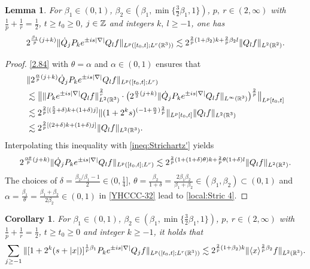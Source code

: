 \documentclass[11pt,twoside]{article}
\def\Z{\mathop{\mathbb Z\kern 0pt}\nolimits}
\def\R{\mathop{\mathbb R\kern 0pt}\nolimits}
\def\f{\frac}
\def\ls{\lesssim}
\newcommand{\w}[1]{\langle {#1} \rangle}
\newcommand{\q}{\dot{Q}}
\theoremstyle{plain}
\newtheorem{lemma}[theorem]{Lemma}
\newtheorem{cor}[theorem]{Corollary}
\theoremstyle{definition}
\numberwithin{equation}{section}
\begin{document}
	\begin{lemma}\label{lem:Localized Strichartz estimate 4}
For $\beta_1\in(0,1)$, $\beta_2\in(\beta_1,\min\{\f32\beta_1,1\})$, $p,\ r\in(2,\infty)$ with $\f1p+\f1r=\f12$,
$t\ge t_0\ge 0$,  $j\in\Z$ and integers $k,\ l\ge -1$, one has
		\begin{equation}\label{local:Stric 4}
			2^{\f{\beta_1}{p}(j+k)}\|\q_jP_{k}e^{\pm is|\nabla|}Q_lf\|_{L^p([t_0,t];L^r(\R^3))}
			\ls
			2^{\f2p(1+\beta_2)k +  \f2p\beta_2 l}\|Q_lf\|_{L^2(\R^2)}.
		\end{equation}
	\end{lemma}
	\begin{proof}
		\eqref{2.84} with $\theta={\alpha}$ and $\alpha\in(0,1)$ ensures that
		\begin{equation*}
			\begin{split}
				&\|2^{\f{\alpha}{p}(j+k)}\q_jP_{k}e^{\pm is|\nabla|}Q_lf\|_{L^p([t_0,t];L^r)}\\
				&\ls
				\big\|
				\|P_{k}e^{\pm is|\nabla|}Q_lf\|_{L^2(\R^3)}^{\f2r}
				\cdot \big(2^{\f{\alpha}{{2}}(j+k)}\|\q_jP_{k}e^{\pm is|\nabla|}Q_lf\|_{L^\infty(\R^3)}\big)^{\f2p}
				\big\|_{L^p[t_0,t]}\\
				&\ls
				2^{\f2p[(\f52+\delta)k+(1+\delta)j]}\|(1+2^ks)^{(-1+\f\alpha 2)\f2p}\|_{L^p[t_0,t]}\|Q_lf\|_{L^2(\R^3)}\\
				&\ls
				2^{\f2p[(2+\delta)k+(1+\delta)j]}\|Q_lf\|_{L^2(\R^3)}.
			\end{split}
		\end{equation*}
		Interpolating this inequality with \eqref{ineq:Strichartz'} yields
		\begin{equation}\label{YHCCC-32}
			2^{\f{\alpha\theta}{p}(j+k)}\|\q_jP_{k}e^{\pm is|\nabla|}Q_lf\|_{L^p([t_0,t];L^r)}
			\ls 2^{\f2p(1+(1+\delta)\theta)k +  \f2p\theta(1+\delta) l}\|Q_lf\|_{L^2(\R^2)}.
		\end{equation}
		The choices of $\delta=\f{\beta_2/\beta_1-1}{2}\in(0,\f14]$, $\theta = \f{\beta_2}{1+\delta} = \f{2\beta_1\beta_2}{\beta_1+\beta_2}\in(\beta_1,\beta_2)\subset(0,1)$ and $\alpha = \f{\beta_1}{\theta} = \f{\beta_1+\beta_2}{2\beta_2}\in(0,1)$
 in \eqref{YHCCC-32} lead to \eqref{local:Stric 4}.
	\end{proof}
	\begin{cor}\label{cor:Localized Strichartz estimate 4}
		For $\beta_1\in(0,1)$, $\beta_2\in(\beta_1,\min\{\f32\beta_1,1\})$, $p,\ r\in(2,\infty)$ with $\f1p+\f1r=\f12$,
$t\ge t_0\ge 0$ and integer $k\ge -1$, it holds that
			\begin{equation}\label{cor:local:Stric 4}
				\sum_{j\ge-1}\|[1+2^k(s+|x|)]^{\f{1}{p}\beta_1}P_{k}e^{\pm is|\nabla|}Q_jf\|_{L^p([t_0,t];L^r(\R^3))}
				\ls 2^{\f2p(1+\beta_2)k }\|\w{x}^{\f{2}{p}\beta_2}f\|_{L^2(\R^3)}.
		\end{equation}
	\end{cor}
\end{document}

